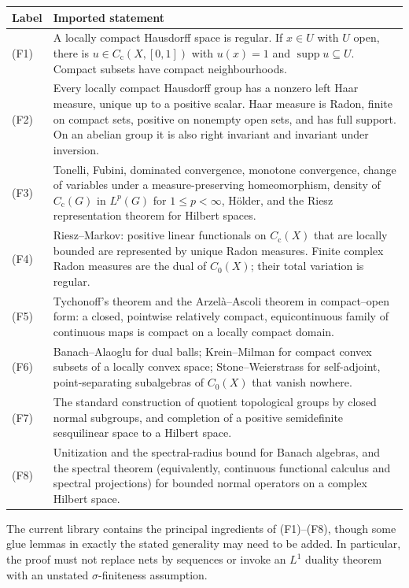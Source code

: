 \documentclass[11pt]{article}
\theoremstyle{definition}
\theoremstyle{remark}
\newcommand{\supp}{\operatorname{supp}}
\newcommand{\Cc}{C_{\mathrm c}}
\newcommand{\Czero}{C_0}
\newcommand{\Lp}[1]{L^{#1}}
\begin{document}
\begin{longtable}{>{\raggedright\arraybackslash}p{}
                  >{\raggedright\arraybackslash}p{}}
\toprule
Label & Imported statement \\
\midrule
\endhead
(F1) & A locally compact Hausdorff space is regular.  If $x\in U$ with $U$ open, there is
$u\in\Cc(X,[0,1])$ with $u(x)=1$ and $\supp u\subseteq U$.  Compact subsets have compact
neighbourhoods. \\
(F2) & Every locally compact Hausdorff group has a nonzero left Haar measure, unique up
to a positive scalar.  Haar measure is Radon, finite on compact sets, positive on nonempty
open sets, and has full support.  On an abelian group it is also right invariant and
invariant under inversion. \\
(F3) & Tonelli, Fubini, dominated convergence, monotone convergence, change of variables
under a measure-preserving homeomorphism, density of $\Cc(G)$ in $\Lp p(G)$ for
$1\leq p<\infty$, H\"older, and the Riesz representation theorem for Hilbert spaces. \\
(F4) & Riesz--Markov: positive linear functionals on $\Cc(X)$ that are locally bounded
are represented by unique Radon measures.  Finite complex Radon measures are the dual of
$\Czero(X)$; their total variation is regular. \\
(F5) & Tychonoff's theorem and the Arzel\`a--Ascoli theorem in compact--open form:
a closed, pointwise relatively compact, equicontinuous family of continuous maps is
compact on a locally compact domain. \\
(F6) & Banach--Alaoglu for dual balls; Krein--Milman for compact convex subsets of a
locally convex space; Stone--Weierstrass for self-adjoint, point-separating subalgebras of
$\Czero(X)$ that vanish nowhere. \\
(F7) & The standard construction of quotient topological groups by closed normal
subgroups, and completion of a positive semidefinite sesquilinear space to a Hilbert
space. \\
(F8) & Unitization and the spectral-radius bound for Banach algebras, and the spectral
theorem (equivalently, continuous functional calculus and spectral projections) for
bounded normal operators on a complex Hilbert space. \\
\bottomrule
\end{longtable}

The current library contains the principal ingredients of (F1)--(F8), though some glue
lemmas in exactly the stated generality may need to be added.  In particular, the proof
must not replace nets by sequences or invoke an $\Lp1$ duality theorem with an unstated
$\sigma$-finiteness assumption.
\end{document}
